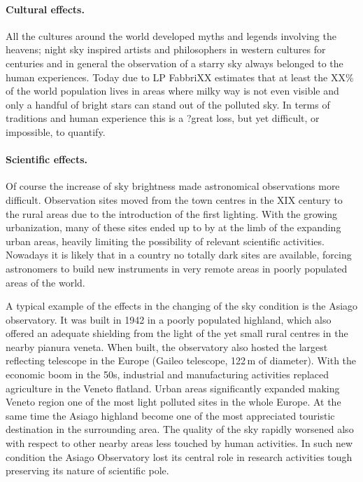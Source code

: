 \documentclass[a4paper, titlepage, 10pt]{book}
\begin{document}
\paragraph{Cultural effects.} All the cultures around the world developed myths and legends involving the heavens; night sky inspired artists and philosophers in western cultures for centuries and in general the observation of a starry sky always belonged to the human experiences. Today due to LP FabbriXX estimates that at least the XX\% of the world population lives in areas where milky way is not even visible and only a handful of bright stars can stand out of the polluted sky. In terms of traditions and human experience this is a ?great loss, but yet difficult, or impossible, to quantify.

\paragraph{Scientific effects.} Of course the increase of sky brightness made astronomical observations more difficult. Observation sites moved from the town centres in the XIX century to the rural areas due to the introduction of the first lighting. With the growing urbanization, many of these sites ended up to by at the limb of the expanding urban areas, heavily limiting the possibility of relevant scientific activities. Nowadays it is likely that in a country no totally dark sites are available, forcing astronomers to build new instruments in very remote areas in poorly populated areas of the world.

A typical example of the effects in the changing of the sky condition is the Asiago observatory. It was built in 1942 in a poorly populated highland, which also offered an adequate shielding from the light of the yet small rural centres in the nearby pianura veneta. When built, the observatory also hosted the largest reflecting telescope in the Europe (Gaileo telescope, 122\,m of diameter).
With the economic boom in the 50s, industrial and manufacturing activities replaced agriculture in the Veneto flatland. Urban areas significantly expanded making Veneto region one of the most light polluted sites in the whole Europe. At the same time the Asiago highland become one of the most appreciated touristic destination in the surrounding area. The quality of the sky rapidly worsened also with respect to other nearby areas less touched by human activities. In such new condition the Asiago Observatory lost its central role in research activities tough preserving its nature of scientific pole.
\end{document}
